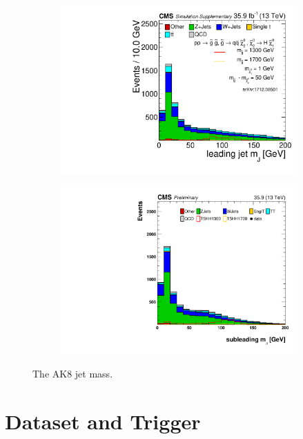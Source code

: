 \begin{figure}[htbp]
\begin{subfigure}[b]{0.5\textwidth}
\centering
\includegraphics[width=\textwidth]{figs/SUS17006/J1Mwide_JetPt.pdf}
\end{subfigure}
\begin{subfigure}[b]{0.5\textwidth}
\centering
\includegraphics[width=\textwidth]{figs/SUS17006/J2Mwide_JetPt.pdf} 
\end{subfigure}
\caption{The AK8 jet mass.}
\label{fig:ak8mass}
\end{figure}

\section{Dataset and Trigger}

